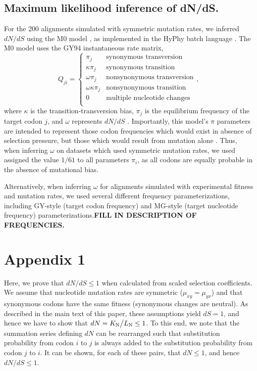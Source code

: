 \documentclass[11pt]{article}
\begin{document}
\subsection*{Maximum likelihood inference of dN/dS.}
For the 200 alignments simulated with symmetric mutation rates, we inferred $dN/dS$ using the M0 model \cite{Yangetal2000}, as implemented in the HyPhy batch language \cite{KosakovskyPondetal2005}. The M0 model uses the GY94 instantaneous rate matrix,
\begin{equation}\label{eq:GY94}
Q_{ji} = \left\{ 
	\begin{array}{rl}
	\pi_j                  &\mbox{synonymous transversion} \\
	\kappa \pi_j           &\mbox{synonymous transition} \\
 	\omega \pi_j           &\mbox{nonsynonymous transversion} \\
 	\omega \kappa \pi_j    &\mbox{nonsynonymous transition} \\
	0                      &\mbox{multiple nucleotide changes} \\             
	\end{array} \right.,
\end{equation}
where $\kappa$ is the transition-transversion bias, $\pi_j$ is the equilibrium frequency of the target codon $j$, and $\omega$ represents $dN/dS$ \cite{GoldmanYang1994,NielsenYang1998}. Importantly, this model's $\pi$ parameters are intended to represent those codon frequencies which would exist in absence of selection pressure, but those which would result from mutation alone \cite{GoldmanYang1994,MuseGaut1994,YN00,Yang2006}. Thus, when inferring $\omega$ on datasets which used symmetric mutation rates, we used assigned the value $1/61$ to all parameters $\pi_i$, as all codons are  equally probable in the absence of mutational bias.

Alternatively, when inferring $\omega$ for alignments simulated with experimental fitness and mutation rates, we used several different frequency parameterizations, including GY-style \cite{GoldmanYang1994} (target codon frequency) and MG-style \cite{MuseGaut1994} (target nucleotide frequency) parameterizations.\textbf{FILL IN DESCRIPTION OF FREQUENCIES.}



\section*{Appendix 1}
Here, we prove that $dN/dS \leq 1$ when calculated from scaled selection coefficients. We assume that nucleotide mutation rates are symmetric ($\mu_{xy} = \mu_{yx}$) and that synonymous codons have the same fitness (synonymous changes are neutral). As described in the main text of this paper, these assumptions yield $dS = 1$, and hence we have to show that $dN = K_\text{N}\big{/}L_\text{N} \leq 1$. To this end, we note that the summation series defining $dN$ can be rearranged such that substitution probability from codon $i$ to $j$ is always added to the substitution probability from codon $j$ to $i$. It can be shown, for each of these pairs, that $dN \leq 1$, and hence $dN/dS \leq 1$.
\end{document}
